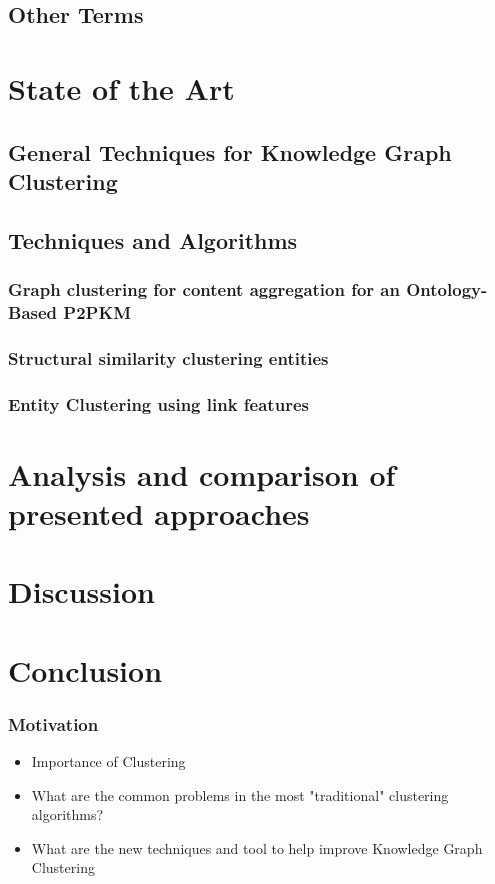 \documentclass{beamer}
\begin{document}
\subsection{Other Terms}
\subsection{}

\section{State of the Art}
\subsection{General Techniques for Knowledge Graph Clustering}
\subsection{Techniques and Algorithms}
\subsubsection{Graph clustering for content aggregation for an Ontology-Based P2PKM}
\subsubsection{Structural similarity clustering entities}
\subsubsection{Entity Clustering using link features}

\section{Analysis and comparison of presented approaches}
\section{Discussion}
\section{Conclusion}



\begin{frame}
\frametitle{Motivation}
\begin{itemize}
   \item Importance of Clustering
   \item What are the common problems in the most "traditional" clustering algorithms?
   \item What are the new techniques and tool to help improve Knowledge Graph Clustering

\end{itemize}

\end{frame}
\end{document}
